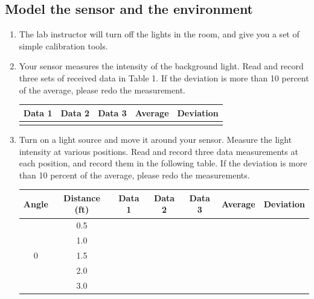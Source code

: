 \documentclass[letterpaper,12pt]{article}
\begin{document}
\subsection*{Model the sensor and the environment}
\begin{enumerate}
    \item The lab instructor will turn off the lights in the room, and give you
        a set of simple calibration tools.
    \item Your sensor measures the intensity of the background light.
        Read and record three sets of received data in Table 1.
        If the deviation is more than 10 percent of the average,
        please redo the measurement.
        \begin{table}[H]
        \begin{center}
            \begin{tabular}{|c|c|c|c|c|}
                \hline
                \textbf{Data 1} & \textbf{Data 2} & \textbf{Data 3} & \textbf{Average} & \textbf{Deviation} \\ \hline
                 & & & & \\ \hline
            \end{tabular}
        \end{center}
        \end{table}
    \item Turn on a light source and move it around your sensor.
        Measure the light intensity at various positions. Read and record three
        data measurements at each position, and record them in the following table.
        If the deviation is more than 10 percent of the average, please redo
        the measurements.
        \begin{table}[H]
        \begin{center}
            \begin{tabular}{|c|c|c|c|c|c|c|}
                \hline
                \textbf{Angle} & \textbf{Distance (ft)} & \textbf{Data 1} & \textbf{Data 2} & \textbf{Data 3} & \textbf{Average} & \textbf{Deviation}\\ \hline
                \multirow{5}{*}{0} & 0.5 & & & & \\ \cline{2-7}
                & 1.0 & & & & \\ \cline{2-7}
                & 1.5 & & & & \\ \cline{2-7}
                & 2.0 & & & & \\ \cline{2-7}
                & 3.0 & & & & \\ \cline{2-7}

\end{tabular}
\end{center}
\end{table}
\end{enumerate}
\end{document}
